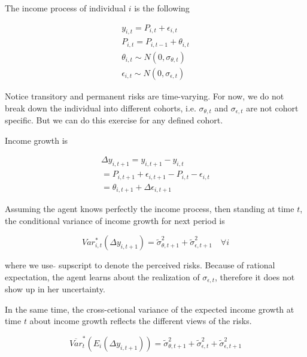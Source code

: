 \documentclass[12pt,notitlepage,onecolumn,aps,pra]{article}
\begin{document}
The income process of individual \(i\) is the following

\begin{equation}
\begin{split}
y_{i,t} = P_{i,t} + \epsilon_{i,t} \\
P_{i,t} = P_{i,t-1} + \theta_{i,t} \\
\theta_{i,t} \sim N(0,\sigma_{\theta,t}) \\
\epsilon_{i,t} \sim N(0,\sigma_{\epsilon,t})
\end{split}
\end{equation}

Notice transitory and permanent risks are time-varying. For now, we do
not break down the individual into different cohorts, i.e.
\(\sigma_{\theta,t}\) and \(\sigma_{\epsilon,t}\) are not cohort
specific. But we can do this exercise for any defined cohort.

Income growth is

\begin{equation}
\begin{split}
\Delta y_{i,t+1} = y_{i,t+1} - y_{i,t} \\
 = P_{i,t+1} + \epsilon_{i,t+1} - P_{i,t} - \epsilon_{i,t} \\
 = \theta_{i,t+1} + \Delta \epsilon_{i,t+1}
\end{split}
\end{equation}

Assuming the agent knows perfectly the income process, then standing at
time \(t\), the conditional variance of income growth for next period is

\begin{equation}
Var^*_{i,t}(\Delta y_{i,t+1}) = \tilde \sigma^2_{\theta,t+1} + \tilde \sigma^2_{\epsilon,t+1} \quad \forall i
\end{equation}

where we use \(\tilde{}\) supscript to denote the perceived risks.
Because of rational expectation, the agent learns about the realization
of \(\sigma_{\epsilon,t}\), therefore it does not show up in her
uncertainty.

In the same time, the cross-cetional variance of the expected income
growth at time \(t\) about income growth reflects the different views of
the risks.

\begin{equation}
\overline {Var}^*_{t}(E_{i}(\Delta y_{i,t+1})) = \tilde \sigma^2_{\theta,t+1} +\tilde \sigma^2_{\epsilon,t}+ \tilde \sigma^2_{\epsilon,t+1}
\end{equation}
\end{document}
